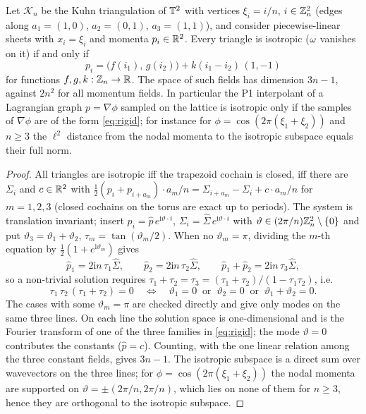 \begin{theorem}\label{thm:rigidity}
Let $\mathcal K_n$ be the Kuhn triangulation of $\mathbb{T}^2$ with vertices $\xi_i=i/n$, $i\in\mathbb{Z}_n^2$ (edges along
$a_1=(1,0)$, $a_2=(0,1)$, $a_3=(1,1)$), and consider piecewise-linear sheets with $x_i=\xi_i$ and momenta
$p_i\in\mathbb{R}^2$. Every triangle is isotropic ($\omega$ vanishes on it) if and only if
\begin{equation}\label{eq:rigid}
p_i=\big(f(i_1),\,g(i_2)\big)+k(i_1-i_2)\,(1,-1)
\end{equation}
for functions $f,g,k:\mathbb{Z}_n\to\mathbb{R}$. The space of such fields has dimension $3n-1$, against $2n^2$ for all momentum
fields. In particular the P1 interpolant of a Lagrangian graph $p=\nabla\phi$ sampled on the lattice is isotropic
only if the samples of $\nabla\phi$ are of the form \eqref{eq:rigid}; for instance for
$\phi=\cos(2\pi(\xi_1+\xi_2))$ and $n\ge3$ the $\ell^2$ distance from the nodal momenta to the isotropic subspace
equals their full norm.
\end{theorem}
\begin{proof}
All triangles are isotropic iff the trapezoid cochain is closed, iff there are $\Sigma_i$ and $c\in\mathbb{R}^2$ with
$\tfrac12(p_i+p_{i+a_m})\cdot a_m/n=\Sigma_{i+a_m}-\Sigma_i+c\cdot a_m/n$ for $m=1,2,3$ (closed cochains on the torus
are exact up to periods). The system is translation invariant; insert $p_i=\hat p\,e^{\mathrm i\vartheta\cdot i}$,
$\Sigma_i=\hat\Sigma\,e^{\mathrm i\vartheta\cdot i}$ with $\vartheta\in(2\pi/n)\mathbb{Z}_n^2\setminus\{0\}$ and put
$\vartheta_3=\vartheta_1+\vartheta_2$, $\tau_m=\tan(\vartheta_m/2)$. When no $\vartheta_m=\pi$, dividing the $m$-th
equation by $\tfrac12(1+e^{\mathrm i\vartheta_m})$ gives
\[
\hat p_1=2\mathrm in\,\tau_1\hat\Sigma,\qquad\hat p_2=2\mathrm in\,\tau_2\hat\Sigma,\qquad\hat p_1+\hat p_2=2\mathrm in\,\tau_3\hat\Sigma ,
\]
so a non-trivial solution requires $\tau_1+\tau_2=\tau_3=(\tau_1+\tau_2)/(1-\tau_1\tau_2)$, i.e.
\begin{equation}\label{eq:symbol}
\tau_1\,\tau_2\,(\tau_1+\tau_2)=0\quad\Longleftrightarrow\quad\vartheta_1=0\ \text{ or }\ \vartheta_2=0\ \text{ or }\ \vartheta_1+\vartheta_2=0 .
\end{equation}
The cases with some $\vartheta_m=\pi$ are checked directly and give only modes on the same three lines. On each
line the solution space is one-dimensional and is the Fourier transform of one of the three families in
\eqref{eq:rigid}; the mode $\vartheta=0$ contributes the constants ($\hat p=c$). Counting, with the one linear
relation among the three constant fields, gives $3n-1$. The isotropic subspace is a direct sum over wavevectors on the three lines; for
$\phi=\cos(2\pi(\xi_1+\xi_2))$ the nodal momenta are supported on $\vartheta=\pm(2\pi/n,2\pi/n)$, which lies on none
of them for $n\ge3$, hence they are orthogonal to the isotropic subspace.
\end{proof}

